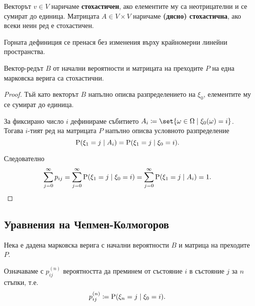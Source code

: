 \documentclass{../../common/topic}
\begin{document}
\begin{definition}
  Векторът \( v \in V \) наричаме \textbf{стохастичен}, ако елементите му са неотрицателни и се сумират до единица. Матрицата \( A \in V \times V \) наричаме \textbf{(дясно) стохастична}, ако всеки неин ред е стохастичен.
\end{definition}

\begin{remark}
  Горната дефиниция се пренася без изменения върху крайномерни линейни пространства.
\end{remark}

\begin{proposition}
  Вектор-редът \( B \) от начални вероятности и матрицата на преходите \( P \) на една марковска верига са стохастични.
\end{proposition}
\begin{proof}
  Тъй като векторът \( B \) напълно описва разпределението на \( \xi_0 \), елементите му се сумират до единица.

  За фиксирано число \( i \) дефинираме събитието \( A_i \coloneqq \set{ \omega \in \Omega \mid \xi_0(\omega) = i } \). Тогава \( i \)-тият ред на матрицата \( P \) напълно описва условното разпределение
  \begin{equation*}
    \operatorname{P}(\xi_1 = j \mid A_i)
    =
    \operatorname{P}(\xi_1 = j \mid \xi_0 = i).
  \end{equation*}

  Следователно
  \begin{equation*}
    \sum_{j=0}^\infty p_{ij}
    =
    \sum_{j=0}^\infty \operatorname{P}(\xi_1 = j \mid \xi_0 = i)
    =
    \sum_{j=0}^\infty \operatorname{P}(\xi_1 = j \mid A_i)
    =
    1.
  \end{equation*}
\end{proof}

\subsection{Уравнения на Чепмен-Колмогоров}

Нека е дадена марковска верига с начални вероятности \( B \) и матрица на преходите \( P \).

Означаваме с \( p^{(n)}_{ij} \) вероятността да преминем от състояние \( i \) в състояние \( j \) за \( n \) стъпки, т.е.
\begin{equation*}
  p^{(n)}_{ij} \coloneqq \operatorname{P}(\xi_n = j \mid \xi_0 = i).
\end{equation*}
\end{document}
